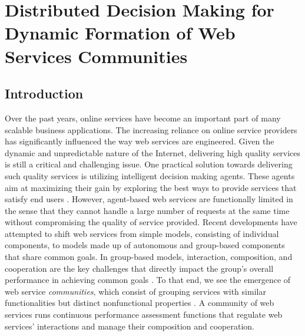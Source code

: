 \setcounter{chapter}{3}

\chapter{Distributed Decision Making for Dynamic Formation of Web Services Communities}\label{cha:PCTLKC}


\section{Introduction}

Over the past years, online services have become an important part of many scalable business applications. The increasing reliance on online service providers has significantly influenced the way web services are engineered. Given the dynamic and unpredictable nature of the Internet, delivering high quality services is still a critical and challenging issue. One practical solution towards delivering such quality services is utilizing intelligent decision making agents. These agents aim at maximizing their gain by exploring the best ways to provide services that satisfy end users \cite{Zeng:2003:QDW:775152.775211, 10.1109/ARES.2008.7, Demirkan2013412, journals/tsc/ZhengZYB13, Josang:2007:STR:1225318.1225716}. However, agent-based web services are functionally limited in the sense that they cannot handle a large number of requests at the same time without compromising the quality of service provided. Recent developments have attempted to shift web services from simple models, consisting of individual components, to models made up of autonomous and group-based components that share common goals. In group-based models, interaction, composition, and cooperation are the key challenges that directly impact the group's overall performance in achieving common goals \cite{ICWS2011-1, SCC2011-1, journals/mags/BaldoniBM10, journals/jcss/CasadoYT13}. To that end, we see the emergence of web service \emph{communities}, which consist of grouping services with similar functionalities but distinct nonfunctional properties \cite{Zeng:2003:QDW:775152.775211, 10.1109/ARES.2008.7, Paik:2005:TSS:2229263.2230038, Medjahed05adynamic}. A community of web services runs continuous performance assessment functions that regulate web services' interactions and manage their composition and cooperation.

